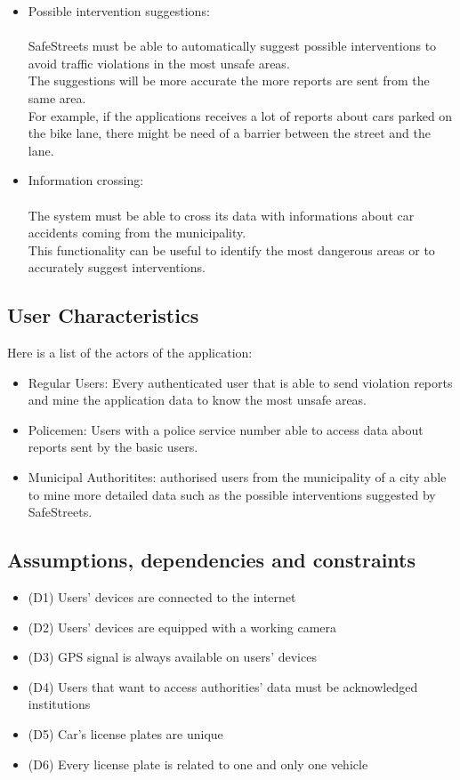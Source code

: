 \begin{itemize}
	\item Possible intervention suggestions: \\ \\
	SafeStreets must be able to automatically suggest possible interventions to avoid traffic violations in the most unsafe areas. \\
	The suggestions will be more accurate the more reports are sent from the same area. \\
	For example, if the applications receives a lot of reports about cars parked on the bike lane, there might be need of a barrier between the street and the lane.
	
	\item Information crossing: \\ \\
	The system must be able to cross its data with informations about car accidents coming from the municipality. \\
	This functionality can be useful to identify the most dangerous areas or to accurately suggest interventions.  
\end{itemize}

\subsection{User Characteristics}
Here is a list of the actors of the application: 
\begin{itemize}
	\item Regular Users: Every authenticated user that is able to send violation reports and mine the application data to know the most unsafe areas. 
	\item Policemen: Users with a police service number able to access data about reports sent by the basic users. 
	\item Municipal Authoritites: authorised users from the municipality of a city able to mine more detailed data such as the possible interventions suggested by SafeStreets. 
\end{itemize}

\subsection{Assumptions, dependencies and constraints }
\begin{itemize}
	\item (D1) Users’ devices are connected to the internet 
	\item (D2) Users’ devices are equipped with a working camera 
	\item (D3) GPS signal is always available on users’ devices 
	\item (D4) Users that want to access authorities’ data must be acknowledged institutions 
	\item (D5) Car’s license plates are unique 
	\item (D6) Every license plate is related to one and only one vehicle
\end{itemize}
 